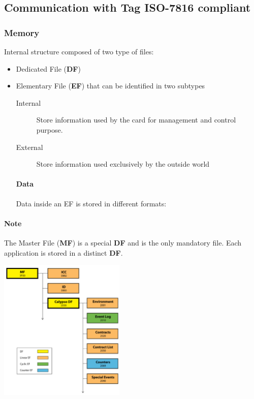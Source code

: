 \subsection{Communication with Tag \textsc{ISO-7816} compliant}

\subsubsection{Memory}
    Internal structure composed of two type of files:
\begin{itemize}
    \item Dedicated File (\textbf{DF})
    \item Elementary File (\textbf{EF}) that can be identified in two subtypes
    \begin{description}
        \item[Internal] Store information used by the card for management and
        control purpose.
        \item[External] Store information used exclusively by the outside world
    \end{description}
    
    \paragraph{Data}
    Data inside an EF is stored in different formats:
\end{itemize}

\paragraph{Note} The Master File (\textbf{MF}) is a special \textbf{DF}
and is the only mandatory file. Each application is stored in a distinct
\textbf{DF}.

\begin{center}
    \includegraphics[width=6cm]{img/7816}
\end{center}

